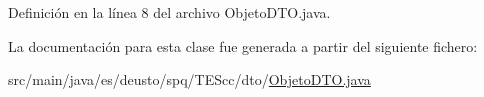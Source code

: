 Definición en la línea 8 del archivo Objeto\+D\+T\+O.\+java.



La documentación para esta clase fue generada a partir del siguiente fichero\+:\begin{DoxyCompactItemize}
\item 
src/main/java/es/deusto/spq/\+T\+E\+Scc/dto/\hyperlink{_objeto_d_t_o_8java}{Objeto\+D\+T\+O.\+java}\end{DoxyCompactItemize}

